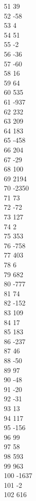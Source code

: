 { 51	39 \\
 52	-58 \\
 53	4 \\
 54	51 \\
 55	-2 \\
 56	-36 \\
 57	-60 \\
 58	16 \\
 59	64 \\
 60	535 \\
 61	-937 \\
 62	232 \\
 63	209 \\
 64	183 \\
 65	-458 \\
 66	204 \\
 67	-29 \\
 68	100 \\
 69	2194 \\
 70	-2350 \\
 71	73 \\
 72	-72 \\
 73	127 \\
 74	2 \\
 75	353 \\
 76	-758 \\
 77	403 \\
 78	6 \\
 79	682 \\
 80	-777 \\
 81	74 \\
 82	-152 \\
 83	109 \\
 84	17 \\
 85	183 \\
 86	-237 \\
 87	46 \\
 88	-50 \\
 89	97 \\
 90	-48 \\
 91	-20 \\
 92	-31 \\
 93	13 \\
 94	117 \\
 95	-156 \\
 96	99 \\
 97	58 \\
 98	593 \\
 99	963 \\
 100	-1637 \\
 101	-2 \\
 102	616 \\
}
